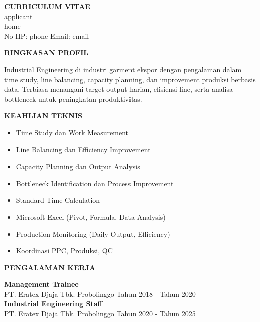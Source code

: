 \documentclass[a4paper,11pt]{article}
\begin{document}
\begin{center}
{\LARGE \textbf{CURRICULUM VITAE}}\\
\vspace{4pt}
{{applicant}}\\
{{home}}\\
No HP: {{phone}} \quad Email: {{email}}
\end{center}

\vspace{8pt}

\textbf{RINGKASAN PROFIL}

Industrial Engineering di industri garment ekspor dengan pengalaman dalam time study, line balancing, capacity planning, dan improvement produksi berbasis data. Terbiasa menangani target output harian, efisiensi line, serta analisa bottleneck untuk peningkatan produktivitas.

\vspace{8pt}

\textbf{KEAHLIAN TEKNIS}

\begin{itemize}
\item Time Study dan Work Measurement
\item Line Balancing dan Efficiency Improvement
\item Capacity Planning dan Output Analysis
\item Bottleneck Identification dan Process Improvement
\item Standard Time Calculation
\item Microsoft Excel (Pivot, Formula, Data Analysis)
\item Production Monitoring (Daily Output, Efficiency)
\item Koordinasi PPC, Produksi, QC
\end{itemize}

\vspace{8pt}

\textbf{PENGALAMAN KERJA}

\textbf{Management Trainee} \\
PT. Eratex Djaja Tbk. Probolinggo \hfill Tahun 2018 - Tahun 2020 \\

\textbf{Industrial Engineering Staff} \\
PT. Eratex Djaja Tbk. Probolinggo \hfill Tahun 2020 - Tahun 2025
\end{document}
